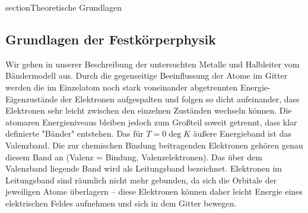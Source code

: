 section{Theoretische Grundlagen}

\subsection{Grundlagen der Festkörperphysik}
Wir gehen in unserer Beschreibung der untersuchten Metalle und Halbleiter 
vom Bändermodell aus. Durch die gegenseitige Beeinflussung der Atome im Gitter
werden die im Einzelatom noch stark voneinander abgetrennten Energie-Eigenzustände
der Elektronen aufgespalten und folgen so dicht aufeinander, dass Elektronen 
sehr leicht zwischen den einzelnen Zuständen wechseln können. Die atomaren
Energieniveaus bleiben jedoch zum Großteil soweit getrennt, dass klar definierte
"Bänder" entstehen. Das für $T = 0\deg K$ äußere Energieband ist das Valenzband.
Die zur chemischen Bindung beitragenden Elektronen gehören genau diesem Band an 
(Valenz = Bindung, Valenzelektronen). Das über dem Valenzband liegende Band wird 
als Leitungsband bezeichnet. Elektronen im Leitungsband sind räumlich nicht mehr 
gebunden, da sich die Orbitale der jeweiligen Atome überlagern – diese Elektronen 
können daher leicht Energie eines elektrischen Feldes aufnehmen und sich in dem 
Gitter bewegen. \\

